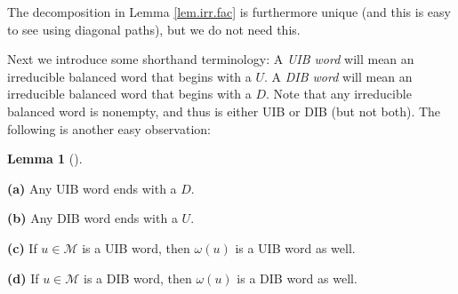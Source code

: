 \documentclass[numbers=enddot,12pt,final,onecolumn,notitlepage]{scrartcl}%
\theoremstyle{definition}
\newtheorem{lem}[theo]{Lemma}
\newenvironment{lemma}[1][]
{\begin{lem}[#1]\begin{leftbar}}
{\end{leftbar}\end{lem}}
\newcommand{\M}{\mathcal{M}}
\begin{document}
The decomposition in Lemma \ref{lem.irr.fac} is furthermore unique (and this
is easy to see using diagonal paths), but we do not need this.

Next we introduce some shorthand terminology: A \emph{UIB word} will mean an
irreducible balanced word that begins with a $U$. A \emph{DIB word} will mean
an irreducible balanced word that begins with a $D$. Note that any irreducible
balanced word is nonempty, and thus is either UIB or DIB (but not both). The
following is another easy observation:

\begin{lemma}
\label{lem.irr-omega}
\textbf{(a)} Any UIB word ends with a $D$.

\textbf{(b)} Any DIB word ends with a $U$.

\textbf{(c)} If $u\in\M$ is a UIB word, then $\omega\left(  u\right)
$ is a UIB word as well.

\textbf{(d)} If $u\in\M$ is a DIB word, then $\omega\left(  u\right)
$ is a DIB word as well.
\end{lemma}
\end{document}
